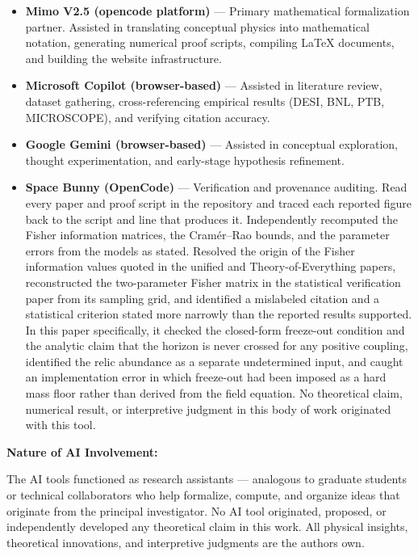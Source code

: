 \documentclass[
  10pt,
]{article}
\providecommand{\tightlist}{%
  \setlength{\itemsep}{0pt}\setlength{\parskip}{0pt}}
\begin{document}
\begin{itemize}
\tightlist
\item
  \textbf{Mimo V2.5 (opencode platform)} --- Primary mathematical
  formalization partner. Assisted in translating conceptual physics into
  mathematical notation, generating numerical proof scripts, compiling
  LaTeX documents, and building the website infrastructure.
\item
  \textbf{Microsoft Copilot (browser-based)} --- Assisted in literature
  review, dataset gathering, cross-referencing empirical results (DESI,
  BNL, PTB, MICROSCOPE), and verifying citation accuracy.
\item
  \textbf{Google Gemini (browser-based)} --- Assisted in conceptual
  exploration, thought experimentation, and early-stage hypothesis
  refinement.
\item
  \textbf{Space Bunny (OpenCode)} --- Verification and provenance
  auditing. Read every paper and proof script in the repository and
  traced each reported figure back to the script and line that produces
  it. Independently recomputed the Fisher information matrices, the
  Cramér--Rao bounds, and the parameter errors from the models as
  stated. Resolved the origin of the Fisher information values quoted in
  the unified and Theory-of-Everything papers, reconstructed the
  two-parameter Fisher matrix in the statistical verification paper from
  its sampling grid, and identified a mislabeled citation and a
  statistical criterion stated more narrowly than the reported results
  supported. In this paper specifically, it checked the closed-form
  freeze-out condition and the analytic claim that the horizon is never
  crossed for any positive coupling, identified the relic abundance as a
  separate undetermined input, and caught an implementation error in
  which freeze-out had been imposed as a hard mass floor rather than
  derived from the field equation. No theoretical claim, numerical
  result, or interpretive judgment in this body of work originated with
  this tool.
\end{itemize}

\textbf{Nature of AI Involvement:}

The AI tools functioned as research assistants --- analogous to graduate
students or technical collaborators who help formalize, compute, and
organize ideas that originate from the principal investigator. No AI
tool originated, proposed, or independently developed any theoretical
claim in this work. All physical insights, theoretical innovations, and
interpretive judgments are the author\textquotesingle s own.
\end{document}
